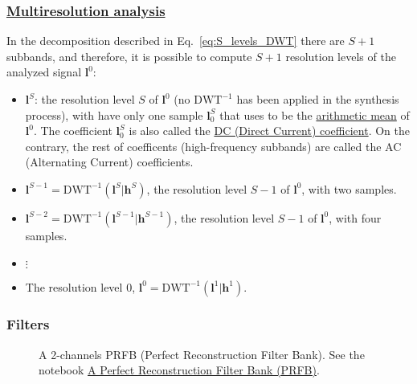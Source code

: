 \subsubsection{\href{https://en.wikipedia.org/wiki/Multiresolution_analysis}{Multiresolution analysis}}
In the decomposition described in Eq.~\eqref{eq:S_levels_DWT} there are
$S+1$ subbands, and therefore, it is possible to compute $S+1$
resolution levels of the analyzed signal ${\mathbf l}^0$:
\begin{itemize}
\item  ${\mathbf l}^S$: the resolution level $S$ of ${\mathbf l}^0$ (no $\text{DWT}^{-1}$ has been
  applied in the synthesis process), with have only one sample ${\mathbf l}^S_0$ that uses to be the
  \href{https://en.wikipedia.org/wiki/Arithmetic_mean}{arithmetic
    mean} of ${\mathbf l}^0$. The coefficient ${\mathbf l}^S_0$
  is also called the \href{https://en.wikipedia.org/wiki/DC_bias}{DC
    (Direct Current) coefficient}. On the contrary, the rest of
  coefficents (high-frequency subbands) are called the AC (Alternating
  Current) coefficients.
\item ${\mathbf l}^{S-1}=\text{DWT}^{-1}({\mathbf l}^S | {\mathbf
  h}^S)$, the resolution level $S-1$ of ${\mathbf l}^0$, with two
  samples.
\item ${\mathbf l}^{S-2}=\text{DWT}^{-1}({\mathbf l}^{S-1} | {\mathbf
  h}^{S-1})$, the resolution level $S-1$ of ${\mathbf l}^0$, with
  four samples.
\item $\vdots$
\item The resolution level $0$, ${\mathbf
  l}^0=\text{DWT}^{-1}({\mathbf l}^1 | {\mathbf h}^1)$.
\end{itemize}  

\subsubsection{Filters}

\begin{figure}
  \centering
  \caption{A 2-channels PRFB (Perfect Reconstruction Filter Bank). See
    the notebook
    \href{https://github.com/vicente-gonzalez-ruiz/DWT/blob/master/docs/PRFB.ipynb}{A
      Perfect Reconstruction Filter Bank (PRFB)}.}
  \label{fig:PRFB}
\end{figure}

